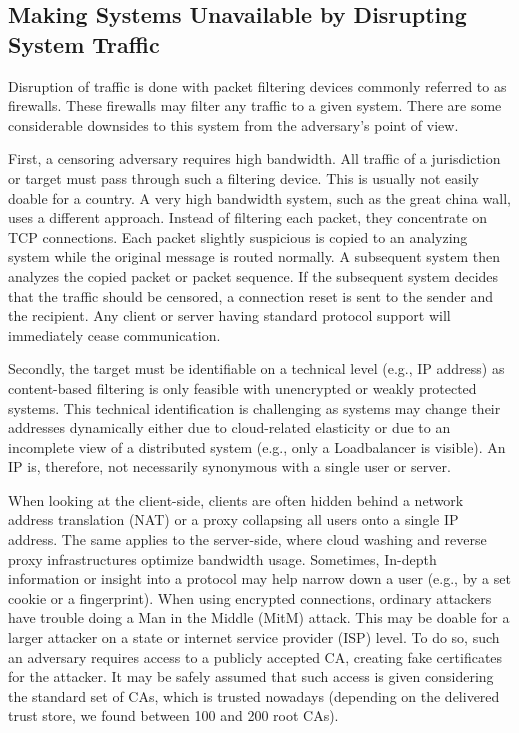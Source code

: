 \subsection{Making Systems Unavailable by Disrupting System Traffic}
Disruption of traffic is done with packet filtering devices commonly referred to as firewalls. These firewalls may filter any traffic to a given system. There are some considerable downsides to this system from the adversary's point of view.

First, a censoring adversary requires high bandwidth. All traffic of a jurisdiction or target must pass through such a filtering device. This is usually not easily doable for a country. A very high bandwidth system, such as the great china wall, uses a different approach. Instead of filtering each packet, they concentrate on TCP connections. Each packet slightly suspicious is copied to an analyzing system while the original message is routed normally. A subsequent system then analyzes the copied packet or packet sequence. If the subsequent system decides that the traffic should be censored, a connection reset is sent to the sender and the recipient. Any client or server having standard protocol support will immediately cease communication.

Secondly, the target must be identifiable on a technical level (e.g., IP address) as content-based filtering is only feasible with unencrypted or weakly protected systems. This technical identification is challenging as systems may change their addresses dynamically either due to cloud-related elasticity or due to an incomplete view of a distributed system (e.g., only a Loadbalancer is visible). An IP is, therefore, not necessarily synonymous with a single user or server. 

When looking at the client-side, clients are often hidden behind a network address translation (NAT) or a proxy collapsing all users onto a single IP address. The same applies to the server-side, where cloud washing and reverse proxy infrastructures optimize bandwidth usage. Sometimes, In-depth information or insight into a protocol may help narrow down a user (e.g., by a set cookie or a fingerprint). When using encrypted connections, ordinary attackers have trouble doing a Man in the Middle (MitM) attack. This may be doable for a larger attacker on a state or internet service provider (ISP) level. To do so, such an adversary requires access to a publicly accepted CA, creating fake certificates for the attacker. It may be safely assumed that such access is given considering the standard set of CAs, which is trusted nowadays (depending on the delivered trust store, we found between 100 and 200 root CAs).

